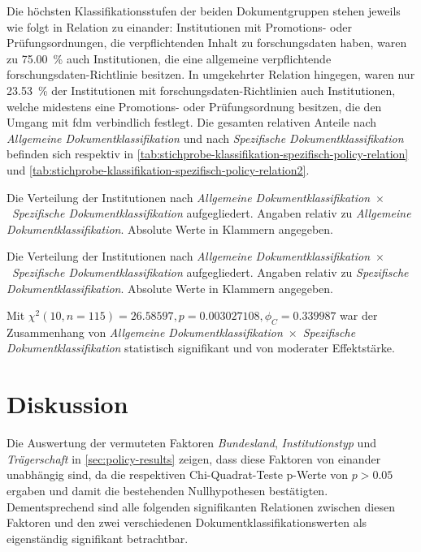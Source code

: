 \noindent Die höchsten Klassifikationsstufen der beiden Dokumentgruppen stehen jeweils wie folgt in Relation zu einander:
Institutionen mit Promotions- oder Prüfungsordnungen, die verpflichtenden Inhalt zu \gls{forschungsdaten} haben, waren zu \SI{75,00}{\percent} auch Institutionen, die eine allgemeine verpflichtende \gls{forschungsdaten}-Richtlinie besitzen.
In umgekehrter Relation hingegen, waren nur \SI{23,53}{\percent} der Institutionen mit \gls{forschungsdaten}-Richtlinien auch Institutionen, welche midestens eine Promotions- oder Prüfungsordnung besitzen, die den Umgang mit \gls{fdm} verbindlich festlegt.
Die gesamten relativen Anteile nach \textit{Allgemeine Dokumentklassifikation} und nach \textit{Spezifische Dokumentklassifikation} befinden sich respektiv in \cref{tab:stichprobe-klassifikation-spezifisch-policy-relation} und \cref{tab:stichprobe-klassifikation-spezifisch-policy-relation2}.
\begin{table}[!htbp]
	\caption{Die Verteilung der Institutionen nach \textit{Allgemeine Dokumentklassifikation}~$\times$~\textit{Spezifische Dokumentklassifikation} aufgegliedert.
    Angaben relativ zu \textit{Allgemeine Dokumentklassifikation}.
    Absolute Werte in Klammern angegeben.}
    
	\label{tab:stichprobe-klassifikation-spezifisch-policy-relation}
\end{table}
\begin{table}[!htbp]
	\caption{Die Verteilung der Institutionen nach \textit{Allgemeine Dokumentklassifikation}~$\times$~\textit{Spezifische Dokumentklassifikation} aufgegliedert.
    Angaben relativ zu \textit{Spezifische Dokumentklassifikation}.
    Absolute Werte in Klammern angegeben.}
    
	\label{tab:stichprobe-klassifikation-spezifisch-policy-relation2}
\end{table}

Mit $\chi^2 (\num{10}, n=\num{115}) = \num[round-mode=places,round-precision=2]{26,58597}, p = \num[round-mode=places,round-precision=3]{0,003027108},\phi_C=\num[round-mode=places,round-precision=2]{0.339987}$ war der Zusammenhang von \textit{Allgemeine Dokumentklassifikation}~$\times$~\textit{Spezifische Dokumentklassifikation} statistisch signifikant und von moderater Effektstärke.


\section{Diskussion}\label{sec:policy-discussion}
Die Auswertung der vermuteten Faktoren \textit{Bundesland}, \textit{Institutionstyp} und \textit{Trägerschaft} in \cref{sec:policy-results} zeigen, dass diese Faktoren von einander unabhängig sind, da die respektiven Chi-Quadrat-Teste p-Werte von $p>\num{0,05}$ ergaben und damit die bestehenden Nullhypothesen bestätigten.
Dementsprechend sind alle folgenden signifikanten Relationen zwischen diesen Faktoren und den zwei verschiedenen Dokumentklassifikationswerten als eigenständig signifikant betrachtbar.

